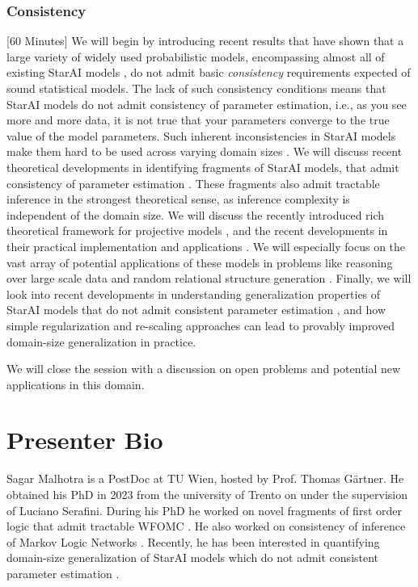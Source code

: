 \subsubsection{Consistency} [60 Minutes] We will begin by introducing recent results \cite{Projectivity_Rinaldo} that have shown  that a large variety of widely used probabilistic models, encompassing almost all of existing StarAI models \cite{Projectivity_first}, do not admit basic \emph{consistency} requirements expected of sound statistical models. The lack of such consistency conditions means that StarAI models do not admit consistency of parameter estimation, i.e., as you see more and more data, it is not true that your parameters converge to the true value of the model parameters.  Such inherent inconsistencies in StarAI models make them hard to be used across varying domain sizes \cite{DA_MLN}. We will discuss recent theoretical developments in identifying fragments of StarAI models, that admit consistency of parameter estimation \cite{ECML_PROJ,Felix_Weit}. These fragments also admit tractable inference in the strongest theoretical sense, as inference complexity is independent of the domain size. We will discuss the recently introduced rich theoretical framework for projective models \cite{ijcai2020p591}, and the recent developments in their practical implementation and applications \cite{jaeger2023a}. We will especially focus on the vast array of potential applications of these models in problems like reasoning over large scale data and random relational structure generation \cite{jaeger2023a}. Finally, we will look into recent developments in understanding generalization properties of StarAI models that do not admit consistent parameter estimation \cite{DA_MLN,chen2024understanding}, and how simple regularization and re-scaling approaches can lead to provably improved domain-size generalization in practice.

We will close the session with a discussion on open problems and potential new applications in this domain.

\section{Presenter Bio}
    Sagar Malhotra is a PostDoc at TU Wien, hosted by Prof. Thomas G{\"a}rtner. He obtained his PhD in 2023 from the university of Trento on  under the supervision of Luciano Serafini. During his PhD he worked on novel fragments of first order logic that admit tractable WFOMC \cite{MalhotraS22,Malhotra2023LiftedIB}. He also worked on consistency of inference of Markov Logic Networks \cite{ECML_PROJ}. Recently, he has been interested in quantifying domain-size generalization of StarAI models which do not admit consistent parameter estimation \cite{chen2024understanding}.